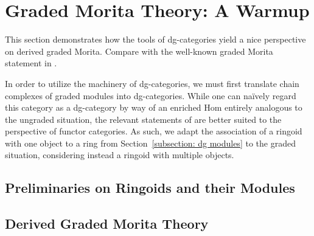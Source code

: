 \chapter{Graded Morita Theory: A Warmup} \label{chapter: graded Morita}

This section demonstrates how the tools of dg-categories yield a nice perspective on derived graded Morita. Compare with the well-known graded Morita statement in \parencite{Zhang96}. 

In order to utilize the machinery of dg-categories, we must first translate chain complexes of graded modules into dg-categories.
While one can na\"ively regard this category as a dg-category by way of an enriched Hom entirely analogous to the ungraded situation, the relevant statements of \parencite{Toen07} are better suited to the perspective of functor categories.
As such, we adapt the association of a ringoid with one object to a ring from Section~\ref{subsection: dg modules} to the graded situation, considering instead a ringoid with multiple objects.

\section{Preliminaries on Ringoids and their Modules}


\section{Derived Graded Morita Theory}

